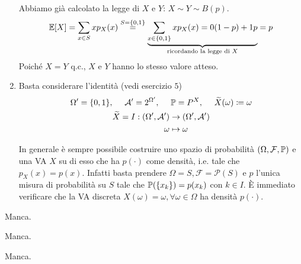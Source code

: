 \begin{enumerate}
Abbiamo già calcolato la legge di $X$ e $Y$: $X\sim Y\sim B(p)$.
\begin{equation*}
\mathbb{E}[X] =\sum\limits_{x\in S} xp_{X}(x)\overset{S=\{0,1\}}{=}\underbrace{\sum\limits_{x\in \{0,1\}} xp_{X}(x) =0(1-p) +1p}_{\text{ricordando la legge di } X} =p
\end{equation*}
Poiché $X=Y$ q.c., $X$ e $Y$ hanno lo stesso valore atteso.
\item Basta considerare l'identità (vedi esercizio $5$)
\begin{gather*}
\Omega '=\{0,1\} ,\ \ \ \ \Ac '=2^{\Omega '} ,\ \ \ \ \PP =P^{X} ,\ \ \ \ \tilde{X}(\omega) \coloneqq \omega \\
\begin{aligned}
\tilde{X} =I:(\Omega ',\Ac ') & \rightarrow (\Omega ',\Ac ')\\
\omega  & \mapsto \omega 
\end{aligned}
\end{gather*}

\begin{rem}
In generale è sempre possibile costruire uno spazio di probabilità $(\Omega ,\mathcal{F} ,\mathbb{P})$ e una VA $X$ su di esso che ha $p(\cdotp)$ come densità, i.e. tale che $p_{X}(x) =p(x)$. Infatti basta prendere $\Omega =S,\mathcal{F} =\mathcal{P}(S)$ e $p$ l'unica misura di probabilità su $S$ tale che $\mathbb{P}(\{x_{k}\}) =p(x_{k})$ con $k\in I$. È immediato verificare che la VA discreta $X(\omega) =\omega ,\forall \omega \in \Omega $ ha densità $p(\cdotp)$.
\end{rem}
\end{enumerate}

\Soluzione

Manca.

\Soluzione

Manca.

\Soluzione

Manca.

\Soluzione

